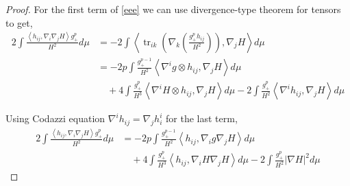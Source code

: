 \begin{proof}
    For the first term of \cref{eee} we can use divergence-type theorem for tensors to get, \begin{align}
        2 \int \frac{\left< h_{ij}, \nabla_{i}\nabla_{j}H \right>g_{+}^{p}}{H^{2}}d \mu & = -2 \int \left<  \operatorname{tr}_{ik}\left( \nabla_{k} \left( \frac{g_{+}^{p}h_{ij}}{H^{2}} \right) \right), \nabla_{j}H \right> d \mu \nonumber\\
        & = -2p \int \frac{g_{+}^{p-1}}{H^{2}} \left<   \nabla^{i}g \otimes h_{ij}, \nabla_{j}H \right>d \mu \nonumber \\
        & \quad + 4 \int \frac{g_{+}^{p}}{H^{3}} \left< \nabla^{i}H \otimes h_{ij}, \nabla_{j}H  \right>d \mu - 2\int \frac{g_{+}^{p}}{H^{2}} \left< \nabla^{i}h_{ij}, \nabla_{j} H \right> d \mu 
    \end{align}

    Using Codazzi equation $ \nabla^{i}h_{ij} = \nabla_{j}h_{i}^{i} $ for the last term, 
    \begin{align}
        2 \int \frac{\left< h_{ij}, \nabla_{i}\nabla_{j}H \right>g_{+}^{p}}{H^{2}}d \mu & = -2p \int \frac{g_{+}^{p-1}}{H^{2}} \left< h_{ij}, \nabla_{i}g \nabla_{j}H \right>d \mu \nonumber \\
        & \quad + 4 \int \frac{g_{+}^{p}}{H^{3}} \left<  h_{ij}, \nabla_{i}H\nabla_{j}H  \right>d \mu -2 \int \frac{g_{+}^{p}}{H^{2}} |\nabla H|^{2}d \mu \label{fff}
    \end{align}


\end{proof}
